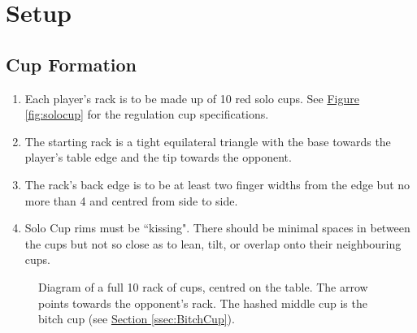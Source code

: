 \section{Setup}\label{sec:SETUP}
	\subsection{Cup Formation}\label{ssec:CupFormation}
		\begin{enumerate}[label=(\roman*), ref=\roman*]
            \item \label{itm:CF,solocups} Each player's rack is to be made up of 10 red  solo cups.
                See \hyperref[fig:solocup]{Figure \ref*{fig:solocup}} for the regulation cup specifications. 
            \item \label{itm:CF,triangle} The starting rack is a tight equilateral triangle with the base towards the player's table edge and the tip towards the opponent. 
            \item \label{itm:CF,position} The rack's back edge is to be at least two finger widths from the edge but no more than 4 and centred from side to side. 
            \item \label{itm:CF,kissing} Solo Cup rims must be ``kissing". There should be minimal spaces in between the cups but not so close as to lean, tilt, or overlap onto their neighbouring cups. 
        \end{enumerate}
        \begin{figure}[H]%
            \centering
            \def\svgwidth{0.4\columnwidth}
            
            \caption{Diagram of a full 10 rack of cups, centred on the table. The arrow points towards the opponent's rack. The hashed middle cup is the bitch cup (see \hyperref[ssec:BitchCup]{Section \ref*{ssec:BitchCup}}).}
            \label{fig:therack}
        \end{figure}
